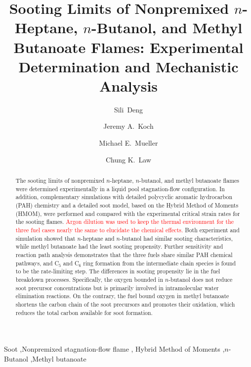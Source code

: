 \documentclass[review,3p,times]{elsarticleUS}
\begin{document}
\begin{frontmatter}

\title{Sooting Limits of Nonpremixed $n$-Heptane, $n$-Butanol, and Methyl Butanoate Flames: Experimental Determination and Mechanistic Analysis}

\author{Sili~Deng}
\author{Jeremy A.~Koch}
\author{Michael E.~Mueller}
\author{Chung K.~Law}

\address{Department of Mechanical and Aerospace Engineering, Princeton University, Princeton, NJ 08544, USA}


\begin{abstract}
The sooting limits of nonpremixed $n$-heptane, $n$-butanol, and methyl butanoate flames were determined experimentally in a liquid pool stagnation-flow configuration.  In addition, complementary simulations with detailed polycyclic aromatic hydrocarbon (PAH) chemistry and a detailed soot model, based on the Hybrid Method of Moments (HMOM), were performed and compared with the experimental critical strain rates for the sooting flames.  \textcolor{red}{Argon dilution was used to keep the thermal environment for the three fuel cases nearly the same to elucidate the chemical effects.  }Both experiment and simulation showed that $n$-heptane and $n$-butanol had similar sooting characteristics, while methyl butanoate had the least sooting propensity.  Further sensitivity and reaction path analysis demonstrates that the three fuels share similar PAH chemical pathways, and C$_5$ and C$_6$ ring formation from the intermediate chain species is found to be the rate-limiting step.  The differences in sooting propensity lie in the fuel breakdown processes.  Specifically, the oxygen bounded in $n$-butanol does not reduce soot precursor concentrations but is primarily involved in intramolecular water elimination reactions. On the contrary, the fuel bound oxygen in methyl butanoate shortens the carbon chain of the soot precursors and promotes their oxidation, which reduces the total carbon available for soot formation. 
\end{abstract}

\begin{keyword} 
Soot \sep Nonpremixed stagnation-flow flame \sep
Hybrid Method of Moments \sep $n$-Butanol \sep Methyl butanoate
\end{keyword}

\end{frontmatter}

\end{document}
